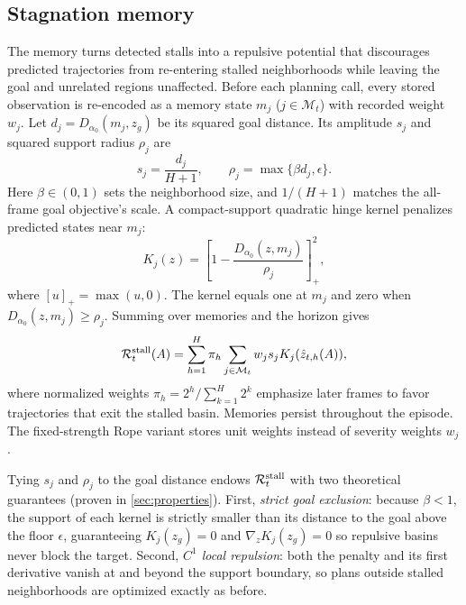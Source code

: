 \subsection{Stagnation memory}
\label{sec:memory}
The memory turns detected stalls into a repulsive potential that discourages predicted trajectories from re-entering stalled neighborhoods while leaving the goal and unrelated regions unaffected. Before each planning call, every stored observation is re-encoded as a memory state $m_j$ ($j\in\mathcal M_t$) with recorded weight $w_j$. Let $d_j=D_{\alpha_0}(m_j,z_g)$ be its squared goal distance. Its amplitude $s_j$ and squared support radius $\rho_j$ are
\begin{equation}
 s_j=\frac{d_j}{H+1},\qquad
 \rho_j=\max\{\beta d_j,\epsilon\}.
 \label{eq:memoryscale}
\end{equation}
Here $\beta\in(0,1)$ sets the neighborhood size, and $1/(H+1)$ matches the all-frame goal objective's scale. A compact-support quadratic hinge kernel penalizes predicted states near $m_j$:
\begin{equation}
 K_j(z)=\left[1-\frac{D_{\alpha_0}(z,m_j)}{\rho_j}\right]_+^2,
 \label{eq:kernel}
\end{equation}
where $[u]_+=\max(u,0)$. The kernel equals one at $m_j$ and zero when $D_{\alpha_0}(z,m_j)\geq\rho_j$. Summing over memories and the horizon gives
\begin{equation}
 \mathcal R_t^{\rm stall}(A)
 =\sum_{h=1}^{H}\pi_h
 \sum_{j\in\mathcal M_t}w_js_jK_j(\hat z_{t,h}(A)),
 \label{eq:penalty}
\end{equation}
where normalized weights $\pi_h=2^h/\sum_{k=1}^{H}2^k$ emphasize later frames to favor trajectories that exit the stalled basin. Memories persist throughout the episode. The fixed-strength Rope variant stores unit weights instead of severity weights $w_j$.

Tying $s_j$ and $\rho_j$ to the goal distance endows $\mathcal R_t^{\rm stall}$ with two theoretical guarantees (proven in \cref{sec:properties}). First, \emph{strict goal exclusion}: because $\beta<1$, the support of each kernel is strictly smaller than its distance to the goal above the floor $\epsilon$, guaranteeing $K_j(z_g)=0$ and $\nabla_z K_j(z_g)=0$ so repulsive basins never block the target. Second, \emph{$C^1$ local repulsion}: both the penalty and its first derivative vanish at and beyond the support boundary, so plans outside stalled neighborhoods are optimized exactly as before.

